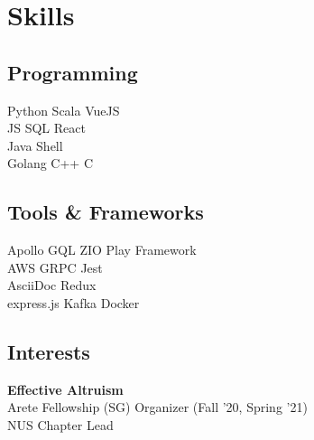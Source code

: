 \documentclass[]{deedy-resume-openfont}
\begin{document}
\begin{minipage}[t]{0.33\textwidth}

\section{Skills}
\subsection{Programming}
Python \textbullet{} Scala \textbullet{} VueJS  \\ 
JS  \textbullet{} SQL \textbullet{} React\\
\vspace{3mm}
Java\textbullet{} Shell \\ Golang \textbullet{} C++ \textbullet{} C \\
\sectionsep

\subsection{Tools \& Frameworks}
Apollo GQL \textbullet{} ZIO \textbullet{} Play Framework \\ AWS \textbullet{} GRPC \textbullet{} Jest \\ AsciiDoc \textbullet{} Redux \\ express.js \textbullet{} Kafka \textbullet{} Docker
\sectionsep

\subsection{Interests}
\textbf{Effective Altruism} \\
Arete Fellowship (SG) Organizer (Fall '20, Spring '21)\\
NUS Chapter Lead\\

%
%

\end{minipage} 
\hfill
\end{document}
